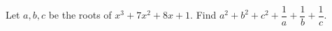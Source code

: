 Let $a,b,c$ be the roots of $x^3+7x^2+8x+1$. Find $a^2+b^2+c^2+\dfrac{1}{a}+\dfrac{1}{b}+\dfrac{1}{c}$.
